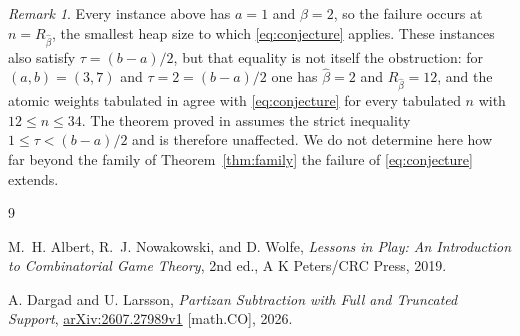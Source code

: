 \documentclass[11pt]{amsart}
\theoremstyle{remark}
\newtheorem*{remark}{Remark}
\begin{document}
\begin{remark}
Every instance above has $a=1$ and $\widehat\beta=2$, so the failure
occurs at $n=R_{\widehat\beta}$, the smallest heap size to which
\eqref{eq:conjecture} applies. These instances also satisfy
$\tau=(b-a)/2$, but that equality is not itself the obstruction: for
$(a,b)=(3,7)$ and $\tau=2=(b-a)/2$ one has $\widehat\beta=2$ and
$R_{\widehat\beta}=12$, and the atomic weights tabulated in
\cite[Table~4]{DL} agree with \eqref{eq:conjecture} for every tabulated
$n$ with $12\leq n\leq34$. The theorem proved in
\cite[Theorem~1.5]{DL} assumes the strict inequality
$1\leq\tau<(b-a)/2$ and is therefore unaffected. We do not determine
here how far beyond the family of Theorem~\ref{thm:family} the failure
of \eqref{eq:conjecture} extends.
\end{remark}

\begin{thebibliography}{9}

M.~H. Albert, R.~J. Nowakowski, and D. Wolfe,
\emph{Lessons in Play: An Introduction to Combinatorial Game Theory},
2nd ed., A K Peters/CRC Press, 2019.

A. Dargad and U. Larsson,
\emph{Partizan Subtraction with Full and Truncated Support},
\href{https://arxiv.org/abs/2607.27989v1}{arXiv:2607.27989v1}
[math.CO], 2026.

\end{thebibliography}
\end{document}
